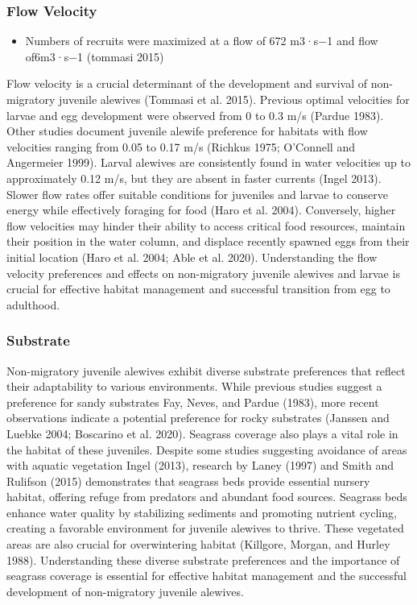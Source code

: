 \documentclass[
]{book}
\providecommand{\tightlist}{%
  \setlength{\itemsep}{0pt}\setlength{\parskip}{0pt}}
\begin{document}
\hypertarget{flow-velocity-1}{%
\subsubsection{Flow Velocity}\label{flow-velocity-1}}

\begin{itemize}
\tightlist
\item
  Numbers of recruits were maximized at a flow of 672 m3·s−1 and flow of6m3·s−1 (tommasi 2015)
\end{itemize}

Flow velocity is a crucial determinant of the development and survival of non-migratory juvenile alewives (Tommasi et al. 2015).
Previous optimal velocities for larvae and egg development were observed from 0 to 0.3 m/s (Pardue 1983).
Other studies document juvenile alewife preference for habitats with flow velocities ranging from 0.05 to 0.17 m/s (Richkus 1975; O'Connell and Angermeier 1999).
Larval alewives are consistently found in water velocities up to approximately 0.12 m/s, but they are absent in faster currents (Ingel 2013).
Slower flow rates offer suitable conditions for juveniles and larvae to conserve energy while effectively foraging for food (Haro et al. 2004).
Conversely, higher flow velocities may hinder their ability to access critical food resources, maintain their position in the water column, and displace recently spawned eggs from their initial location (Haro et al. 2004; Able et al. 2020).
Understanding the flow velocity preferences and effects on non-migratory juvenile alewives and larvae is crucial for effective habitat management and successful transition from egg to adulthood.

\hypertarget{substrate-1}{%
\subsubsection{Substrate}\label{substrate-1}}

Non-migratory juvenile alewives exhibit diverse substrate preferences that reflect their adaptability to various environments.
While previous studies suggest a preference for sandy substrates Fay, Neves, and Pardue (1983), more recent observations indicate a potential preference for rocky substrates (Janssen and Luebke 2004; Boscarino et al. 2020).
Seagrass coverage also plays a vital role in the habitat of these juveniles.
Despite some studies suggesting avoidance of areas with aquatic vegetation Ingel (2013), research by Laney (1997) and Smith and Rulifson (2015) demonstrates that seagrass beds provide essential nursery habitat, offering refuge from predators and abundant food sources.
Seagrass beds enhance water quality by stabilizing sediments and promoting nutrient cycling, creating a favorable environment for juvenile alewives to thrive.
These vegetated areas are also crucial for overwintering habitat (Killgore, Morgan, and Hurley 1988).
Understanding these diverse substrate preferences and the importance of seagrass coverage is essential for effective habitat management and the successful development of non-migratory juvenile alewives.
\end{document}
